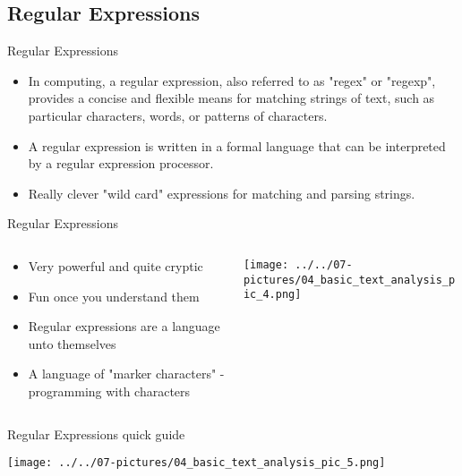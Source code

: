 \documentclass[11pt]{beamer}
\begin{document}
\subsection{Regular Expressions \\ \scalebox{0.8}{}}
\begin{frame}{Regular Expressions}
	\begin{itemize}
		\item In computing, a regular expression, also referred to as "regex" or "regexp", provides a concise and flexible means for matching strings of text, such as particular characters, words, or patterns of characters. 
		\item A regular expression is written in a formal language that can be interpreted by a regular expression processor.
		\item Really clever "wild card" expressions for matching and parsing strings.
	\end{itemize}
\end{frame}
\begin{frame}{Regular Expressions}
\begin{columns}[T] %
\begin{column}{.48\textwidth}
        \begin{itemize}
		\item Very powerful and quite cryptic
		\item Fun once you understand them
		\item Regular expressions are a language unto themselves
		\item A language of "marker characters" - programming with characters
        \end{itemize}
\end{column}%
\hfill%
\begin{column}{.48\textwidth}
        \texttt{[image: ../../07-pictures/04\_basic\_text\_analysis\_pic\_4.png]}
\end{column}%
\end{columns}
\end{frame}
\begin{frame}{Regular Expressions quick guide}
	\begin{center}
	\texttt{[image: ../../07-pictures/04\_basic\_text\_analysis\_pic\_5.png]}
	\end{center}
\end{frame}
\end{document}
